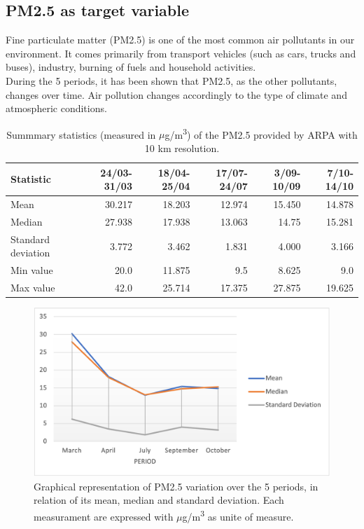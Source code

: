 \subsection{PM2.5 as target variable}
Fine particulate matter (PM2.5) is one of the most common air pollutants in our environment. 
It comes primarily from transport vehicles (such as cars, trucks and buses), industry, burning of fuels and household activities. \\
During the 5 periods, it has been shown that PM2.5, as the other pollutants, changes over time. Air pollution changes accordingly to the type of climate and atmospheric conditions.\\
\begin{table}[H]
\centering
\begin{tabular}{lrrrrr}
\toprule
 Statistic &  24/03-31/03 &  18/04-25/04 &  17/07-24/07 &  3/09-10/09 &  7/10-14/10 \\
\midrule
  Mean  &        30.217  &         18.203  &         12.974 &       15.450 &       14.878 \\
Median  &        27.938 &        17.938 &        13.063 &       14.75 &       15.281 \\
 Standard deviation &        3.772 &        3.462 &        1.831 &       4.000 &       3.166 \\
  Min value &        20.0  &        11.875 &        9.5 &        8.625 &       9.0 \\
  Max value &        42.0 &        25.714 &        17.375 &        27.875 &       19.625 \\
\bottomrule
\end{tabular}
\caption{Summmary statistics (measured in $\mu$g/m\textsuperscript{3}) of the PM2.5 provided by ARPA with 10 km resolution.}
\label{tab:statspm25}
\end{table}
\begin{figure}[H]
    \centering
    \includegraphics[scale=0.8]{images/pm25_values.png}
    \caption{Graphical representation of PM2.5 variation over the 5 periods, in relation of its mean, median and standard deviation. Each measurament are expressed with $\mu$g/m\textsuperscript{3} as unite of measure.}
    \label{fig:graphstatspm2.5}
\end{figure}
